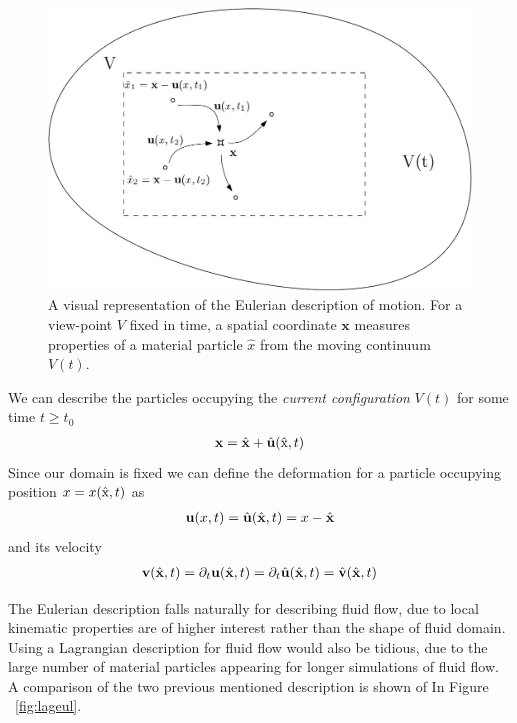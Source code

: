 \begin{figure}[h!]
  \centering
    \includegraphics[scale=0.3]{./Fig/eulerian.png}
      \caption{A visual representation of the Eulerian description of motion. For a  view-point  $V$ fixed in time, a spatial coordinate $\mathbf{x}$ measures properties of a material particle $\hat{x}$ from the moving continuum  $V(t)$.}
\end{figure} 

\newpage
We can describe the particles occupying the \textit{current configuration} $V(t)$ for some time $t \geq t_0$ 
\begin{align*}
\mathbf{x} = \hat{\mathbf{x}} + \hat{\mathbf{u}}(\text{\^{x}}, t)	
\end{align*}
Since our domain is fixed we can define the deformation for a particle 
occupying position $x = x(\text{\^{x}},t)$ as
\begin{align*}
\textbf{u}(x, t) = \hat{\mathbf{u}}(\hat{\mathbf{x}}, t) = x - \hat{\mathbf{x}}	\\
\end{align*}
and its velocity
\begin{align*}
\textbf{v}(\hat{\mathbf{x}},t) = \partial_t \mathbf{u}(\hat{\mathbf{x}},t) = \partial_t \hat{\mathbf{u}}(\hat{\mathbf{x}},t) = \hat{\mathbf{v}}(\hat{\mathbf{x}},t)
\end{align*}

The Eulerian description falls naturally for describing fluid flow, due to local kinematic properties are of higher interest rather than the shape of fluid domain. Using a Lagrangian description for fluid flow would also be tidious, due to the large number of material particles appearing for longer simulations of fluid flow. A comparison of the two previous mentioned description is shown of In Figure ~\ref{fig:lageul}.

